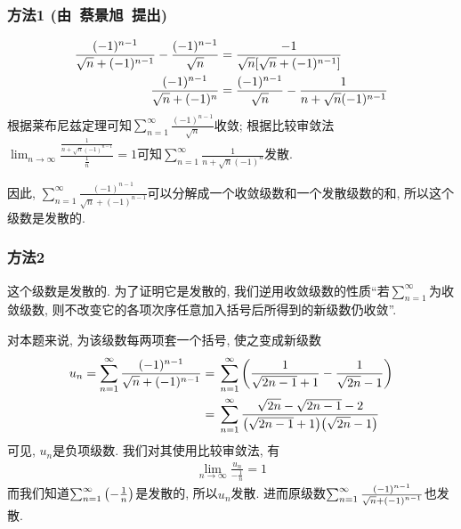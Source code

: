 \documentclass[12pt]{ctexart}
\begin{document}
\section{}
\subsection{}
\subsubsection*{方法1 (由\ 蔡景旭\ 提出) }
\begin{align*}
	\frac{(-1)^{n-1}}{\sqrt{n}+(-1)^{n-1}}-\frac{(-1)^{n-1}}{\sqrt{n}}={}&\frac{-1}{\sqrt{n}\qty[\sqrt{n}+(-1)^{n-1}]}\\
	\frac{(-1)^{n-1}}{\sqrt{n}+(-1)^n}={}&\frac{(-1)^{n-1}}{\sqrt{n}}-\frac{1}{n+\sqrt{n}(-1)^{n-1}}
\end{align*}
根据莱布尼兹定理可知$\sum_{n=1}^{\infty}\frac{(-1)^{n-1}}{\sqrt{n}}$收敛; 根据比较审敛法$\lim_{n\rightarrow\infty}\frac{\frac{1}{n+\sqrt{n}(-1)^{n-1}}}{\frac{1}{n}}=1$可知$\sum_{n=1}^{\infty}\frac{1}{n+\sqrt{n}(-1)^{n}}$发散.\par
因此, $\sum_{n=1}^{\infty}\frac{(-1)^{n-1}}{\sqrt{n}+(-1)^{n-1}}$可以分解成一个收敛级数和一个发散级数的和, 所以这个级数是发散的.\par
\subsubsection*{方法2}
这个级数是发散的. 为了证明它是发散的, 我们逆用收敛级数的性质``若$\sum_{n=1}^{\infty}$为收敛级数, 则不改变它的各项次序任意加入括号后所得到的新级数仍收敛''.\par
对本题来说, 为该级数每两项套一个括号, 使之变成新级数
\begin{align*}
	u_n=\sum_{n=1}^{\infty}\frac{(-1)^{n-1}}{\sqrt{n}+(-1)^{n-1}}={}&\sum_{n=1}^{\infty}\qty(\frac{1}{\sqrt{2n-1}+1}-\frac{1}{\sqrt{2n}-1})\\
	={}&\sum_{n=1}^{\infty}\frac{\sqrt{2n}-\sqrt{2n-1}-2}{\qty(\sqrt{2n-1}+1)\qty(\sqrt{2n}-1)}
\end{align*}
可见, $u_n$是负项级数. 我们对其使用比较审敛法, 有
\begin{align*}
	\lim_{n\rightarrow\infty}\frac{u_n}{-\frac{1}{n}}=1
\end{align*}
而我们知道$\sum_{n=1}^{\infty}\qty(-\frac{1}{n})$是发散的, 所以$u_n$发散. 进而原级数$\sum_{n=1}^{\infty}\frac{(-1)^{n-1}}{\sqrt{n}+\qty(-1)^{n-1}}$也发散.\par
\end{document}
